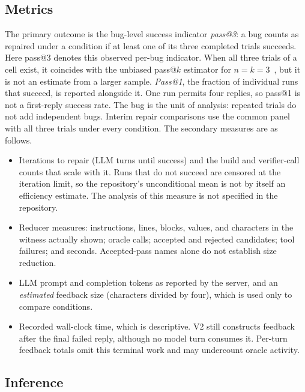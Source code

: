 \documentclass[conference]{IEEEtran}
\begin{document}
\subsection{Metrics}

The primary outcome is the bug-level success indicator \emph{pass@3}: a bug counts as repaired under a condition if at least one of its three completed trials succeeds. Here pass@3 denotes this observed per-bug indicator. When all three trials of a cell exist, it coincides with the unbiased pass@$k$ estimator for $n=k=3$~\cite{yang2026reducefix}, but it is not an estimate from a larger sample. \emph{Pass@1}, the fraction of individual runs that succeed, is reported alongside it. One run permits four replies, so pass@1 is not a first-reply success rate. The bug is the unit of analysis: repeated trials do not add independent bugs. Interim repair comparisons use the common panel with all three trials under every condition. The secondary measures are as follows.
\begin{itemize}
\item Iterations to repair (LLM turns until success) and the build and verifier-call counts that scale with it. Runs that do not succeed are censored at the iteration limit, so the repository's unconditional mean is not by itself an efficiency estimate. The analysis of this measure is not specified in the repository.
\item Reducer measures: instructions, lines, blocks, values, and characters in the witness actually shown; oracle calls; accepted and rejected candidates; tool failures; and seconds. Accepted-pass names alone do not establish size reduction.
\item LLM prompt and completion tokens as reported by the server, and an \emph{estimated} feedback size (characters divided by four), which is used only to compare conditions.
\item Recorded wall-clock time, which is descriptive. V2 still constructs feedback after the final failed reply, although no model turn consumes it. Per-turn feedback totals omit this terminal work and may undercount oracle activity.
\end{itemize}

\subsection{Inference}
\end{document}
